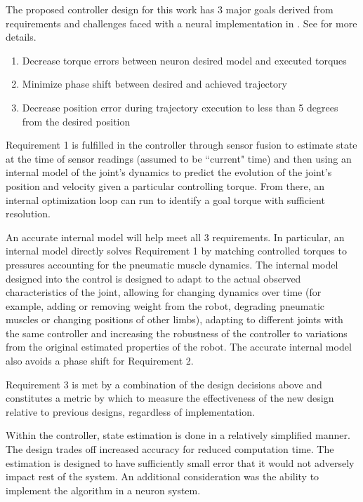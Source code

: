 The proposed controller design for this work has 3 major goals derived from
requirements and challenges faced with a neural implementation in
\cite{HuntPhDThesis}. See  for more details.

\begin{enumerate}
\item Decrease torque errors between neuron desired model and executed torques
\item Minimize phase shift between desired and achieved trajectory
\item Decrease position error during trajectory execution to less than 5 degrees from the desired position
\end{enumerate}

Requirement 1 is fulfilled in
the controller through sensor fusion to estimate state at the time of sensor
readings (assumed to be ``current" time) and then using an internal model of the
joint's dynamics to predict the evolution of the joint's position and velocity
given a particular controlling torque. From there, an internal optimization loop
can run to identify a goal torque with sufficient resolution.

An accurate internal model will help meet all 3 requirements. In particular, an
internal model directly solves Requirement 1 by matching controlled torques to
pressures accounting for the pneumatic muscle dynamics. The internal model
designed into the control is designed to adapt to the actual observed
characteristics of the joint, allowing for changing dynamics over time (for
example, adding or removing weight from the robot, degrading pneumatic muscles
or changing positions of other limbs),
adapting to different joints with the same controller and increasing the
robustness of the controller to variations from the original estimated
properties of the robot. The accurate internal model also avoids a phase shift for Requirement 2. 

Requirement 3 is met by a combination of the design decisions above and
constitutes a metric by which to measure the effectiveness of the new design
relative to previous designs, regardless of implementation.


Within the controller, state estimation is done in a relatively simplified
manner. The design trades off increased accuracy for reduced computation time. The 
estimation is designed to have sufficiently small error that it would not adversely impact rest of the system. An additional consideration
was the ability to implement the algorithm in a neuron system.

